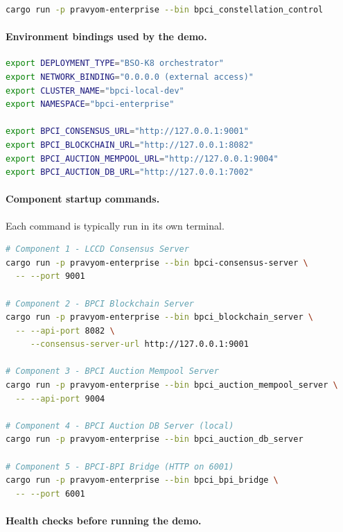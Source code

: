 \begin{lstlisting}[language=bash]
cargo run -p pravyom-enterprise --bin bpci_constellation_control
\end{lstlisting}

\paragraph{Environment bindings used by the demo.}

\begin{lstlisting}[language=bash]
export DEPLOYMENT_TYPE="BSO-K8 orchestrator"
export NETWORK_BINDING="0.0.0.0 (external access)"
export CLUSTER_NAME="bpci-local-dev"
export NAMESPACE="bpci-enterprise"

export BPCI_CONSENSUS_URL="http://127.0.0.1:9001"
export BPCI_BLOCKCHAIN_URL="http://127.0.0.1:8082"
export BPCI_AUCTION_MEMPOOL_URL="http://127.0.0.1:9004"
export BPCI_AUCTION_DB_URL="http://127.0.0.1:7002"
\end{lstlisting}

\paragraph{Component startup commands.}
Each command is typically run in its own terminal.

\begin{lstlisting}[language=bash]
# Component 1 - LCCD Consensus Server
cargo run -p pravyom-enterprise --bin bpci-consensus-server \
  -- --port 9001

# Component 2 - BPCI Blockchain Server
cargo run -p pravyom-enterprise --bin bpci_blockchain_server \
  -- --api-port 8082 \
     --consensus-server-url http://127.0.0.1:9001

# Component 3 - BPCI Auction Mempool Server
cargo run -p pravyom-enterprise --bin bpci_auction_mempool_server \
  -- --api-port 9004

# Component 4 - BPCI Auction DB Server (local)
cargo run -p pravyom-enterprise --bin bpci_auction_db_server

# Component 5 - BPCI-BPI Bridge (HTTP on 6001)
cargo run -p pravyom-enterprise --bin bpci_bpi_bridge \
  -- --port 6001
\end{lstlisting}

\paragraph{Health checks before running the demo.}

